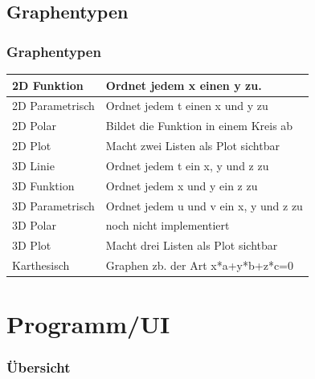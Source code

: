 \documentclass{beamer}
\begin{document}
\subsection{Graphentypen}
\begin{frame}\frametitle{Graphentypen}
\begin{tabular}[b]{|l|l|}
\hline
2D Funktion & Ordnet jedem x einen y zu. \\
\hline
2D Parametrisch & Ordnet jedem t einen x und y zu \\
\hline
2D Polar & Bildet die Funktion in einem Kreis ab \\
\hline
2D Plot & Macht zwei Listen als Plot sichtbar \\
\hline
3D Linie & Ordnet jedem t ein x, y und z zu \\
\hline
3D Funktion & Ordnet jedem x und y ein z zu \\
\hline
3D Parametrisch & Ordnet jedem u und v ein x, y und z zu \\
\hline
3D Polar & noch nicht implementiert \\
\hline
3D Plot & Macht drei Listen als Plot sichtbar \\
\hline
Karthesisch & Graphen zb. der Art x*a+y*b+z*c=0 \\
\hline
\end{tabular}
\end{frame}
\section{Programm/UI} 
  \begin{frame}[shrink]
    \frametitle{Übersicht}
    \tableofcontents[currentsection]
  \end{frame}
\end{document}
